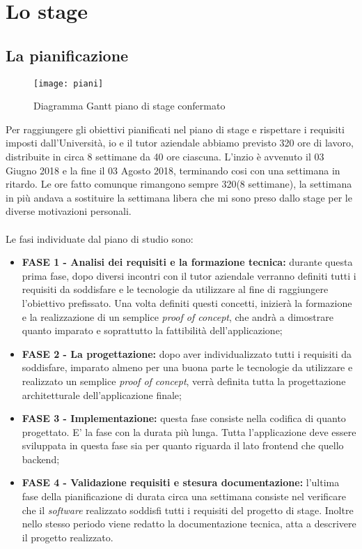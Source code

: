 
\chapter{Lo stage}
\label{cap:progettazione}
\label{sec:tecnologie-strumenti}
 \section{La pianificazione}
 \begin{figure}[!h] 
 	\centering 
 	\texttt{[image: piani]} 
 	\caption{Diagramma Gantt piano di stage confermato}
 \end{figure}
Per raggiungere gli obiettivi pianificati nel piano di stage e rispettare i
requisiti imposti dall’Università, io e il tutor aziendale abbiamo
previsto 320 ore di lavoro, distribuite in circa 8 settimane da 40 ore ciascuna.
L'inzio è avvenuto il 03 Giugno 2018 e la fine il 03 Agosto 2018, 
terminando cosi con una settimana in ritardo. Le ore fatto comunque rimangono sempre 320(8 settimane), la settimana in più andava a sostituire la settimana libera che mi sono preso dallo stage per le diverse motivazioni personali. 
\\
\\
Le fasi individuate dal piano di studio sono:

\begin{itemize}
	\item \textbf{FASE 1 - Analisi dei requisiti e la formazione tecnica:} durante questa prima fase, dopo diversi incontri con il tutor aziendale verranno definiti tutti i requisiti da soddisfare e le tecnologie da utilizzare al fine di raggiungere l'obiettivo prefissato. Una volta definiti questi concetti, inizierà la formazione e la realizzazione di un semplice \emph{proof of concept}, che andrà a dimostrare quanto imparato e soprattutto la fattibilità dell'applicazione;
	\item \textbf{FASE 2 - La progettazione:} dopo aver individualizzato tutti i requisiti da soddisfare, imparato almeno per una buona parte le tecnologie da utilizzare e realizzato un semplice\emph{ proof of concept}, verrà definita tutta la progettazione architetturale dell'applicazione finale;
		\item \textbf{FASE 3 - Implementazione:} questa fase consiste nella codifica di quanto progettato. E' la fase con la durata più lunga. Tutta l'applicazione deve essere sviluppata in questa fase sia per quanto riguarda il lato frontend che quello backend;
		\item \textbf{FASE 4 - Validazione requisiti e stesura documentazione:} l'ultima fase della pianificazione di durata circa una settimana consiste nel verificare che il \emph{software} realizzato soddisfi tutti i requisiti
			del progetto di stage. Inoltre nello stesso periodo viene redatto la documentazione tecnica, atta a descrivere il progetto realizzato.
\end{itemize}

